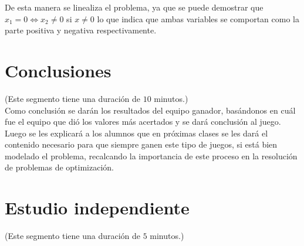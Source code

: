 \documentclass[a4paper,10pt,twocolumn]{article}
\theoremstyle{theorem}
\theoremstyle{definition}
\theoremstyle{remark}
\begin{document}
De esta manera se linealiza el problema, ya que se puede demostrar que $x_1 = 0 \iff x_2 \neq 0$ si $x \neq 0$ lo que indica que ambas variables se comportan como la parte positiva y negativa respectivamente.

\section{Conclusiones} \label{sec:conc}

(Este segmento tiene una duración de $10$ minutos.)\\
 
%

Como conclusión se darán los resultados del equipo ganador, basándonos en cuál fue el equipo que dió los valores más acertados y se dará conclusión al juego.\\

Luego se les explicará a los alumnos que en próximas clases se les dará el contenido necesario para que siempre ganen este tipo de juegos, si está bien modelado el problema, recalcando la importancia de este proceso en la resolución de problemas de optimización.

\section{Estudio independiente} \label{independ}
(Este segmento tiene una duración de $5$ minutos.)\\
 
\end{document}

